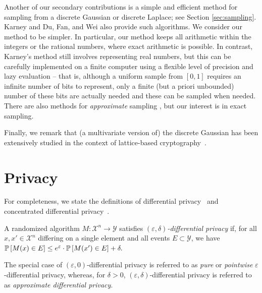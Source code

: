 \documentclass{jpc}
\newcommand{\pr}[2]{{\ifx&#1& \mathbb{P} \else
\underset{#1}{\mathbb{P}} \fi \left[#2\right]}}
\newcommand{\eps}{\varepsilon}
\begin{document}
Another of our secondary contributions is a simple and efficient method for sampling from a discrete Gaussian or discrete Laplace; see Section \ref{sec:sampling}. Karney \cite{Karney16} and Du, Fan, and Wei \cite{DuFW20} also provide such algorithms. We consider our method to be simpler. In particular, our method keeps all arithmetic within the integers or the rational numbers, where exact arithmetic is possible. In contrast, Karney's method still involves representing real numbers, but this can be carefully implemented on a finite computer using a flexible level of precision and lazy evaluation -- that is, although a uniform sample from $[0,1]$ requires an infinite number of bits to represent, only a finite (but a priori unbounded) number of these bits are actually needed and these can be sampled when needed. There are also methods for \emph{approximate} sampling \citep{ZhaoSS19}, but our interest is in exact sampling.

Finally, we remark that (a multivariate version of) the discrete Gaussian has been extensively studied in the context of lattice-based cryptography~\cite[etc.]{GentryPV08,Regev09,Peikert10,Stephens-Davidowitz17}.

\section{Privacy}
\label{sec:privacy}
For completeness, we state the definitions of differential privacy~\citep{DworkMNS06,DworkKMMN06} and concentrated differential privacy~\citep{DworkR16,BunS16}.
\begin{defi}
A randomized algorithm $M\colon \mathcal{X}^n \to \mathcal{Y}$ satisfies \emph{$(\eps,\delta)$-differential privacy} if, for all $x,x'\in\mathcal{X}^n$ differing on a single element and all events $E \subset \mathcal{Y}$, we have $\pr{}{M(x) \in E} \le e^\eps \cdot \pr{}{M(x') \in E} + \delta.$
\end{defi}
The special case of $(\eps,0)$-differential privacy is referred to as \emph{pure} or \emph{pointwise} $\eps$-differential privacy, whereas, for $\delta>0$, $(\eps,\delta)$-differential privacy is referred to as \emph{approximate differential privacy}.
\end{document}
